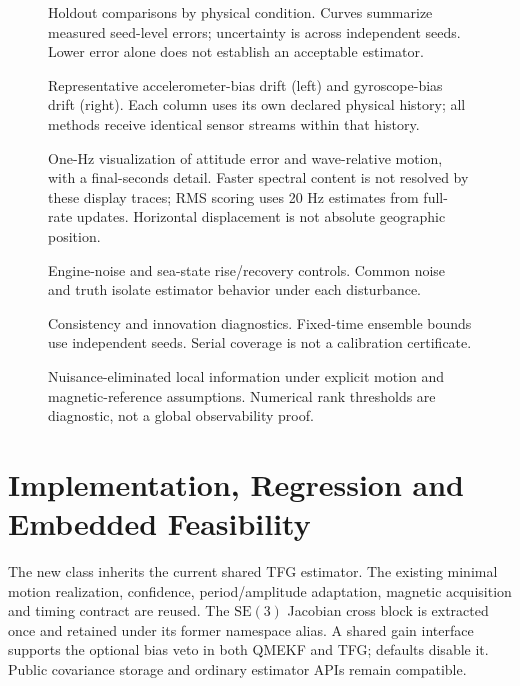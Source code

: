 \documentclass[conference]{IEEEtran}
\newcommand{\IncludePGF}[1]{\resizebox{\linewidth}{!}{}}
\begin{document}
\begin{figure}[t]\centering
\IncludePGF{tangent_accuracy.pgf}
\caption{Holdout comparisons by physical condition. Curves summarize measured
seed-level errors; uncertainty is across independent seeds. Lower error
alone does not establish an acceptable estimator.}\end{figure}
\begin{figure}[t]\centering
\IncludePGF{tangent_bias_tracking.pgf}
\caption{Representative accelerometer-bias drift (left) and gyroscope-bias drift
(right). Each column uses its own declared physical history; all methods
receive identical sensor streams within that history.}\end{figure}
\begin{figure}[t]\centering
\IncludePGF{tangent_motion.pgf}
\caption{One-Hz visualization of attitude error and wave-relative motion,
with a final-seconds detail. Faster spectral content is not resolved by
these display traces; RMS scoring uses 20 Hz estimates from full-rate updates.
Horizontal displacement is not absolute geographic position.}\end{figure}
\begin{figure}[t]\centering
\IncludePGF{tangent_degradation.pgf}
\caption{Engine-noise and sea-state rise/recovery controls. Common noise and
truth isolate estimator behavior under each disturbance.}\end{figure}
\begin{figure}[t]\centering
\IncludePGF{tangent_consistency.pgf}
\caption{Consistency and innovation diagnostics. Fixed-time ensemble bounds
use independent seeds. Serial coverage is not a calibration certificate.}\end{figure}
\begin{figure}[t]\centering
\IncludePGF{tangent_observability.pgf}
\caption{Nuisance-eliminated local information under explicit motion and
magnetic-reference assumptions. Numerical rank thresholds are diagnostic,
not a global observability proof.}\end{figure}
\clearpage\twocolumn

\section{Implementation, Regression and Embedded Feasibility}
The new class inherits the current shared TFG estimator. The existing
minimal motion realization, confidence, period/amplitude adaptation,
magnetic acquisition and timing contract are reused. The $\mathrm{SE}(3)$
Jacobian cross block is extracted once and retained under its former
namespace alias. A shared gain interface supports the optional bias veto in
both QMEKF and TFG; defaults disable it. Public covariance storage and
ordinary estimator APIs remain compatible.
\end{document}
